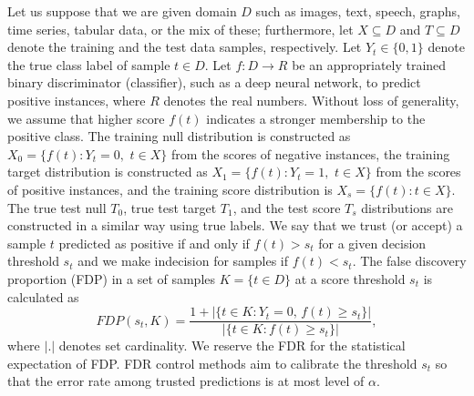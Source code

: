 \documentclass{article}
\begin{document}
Let us suppose that we are given domain $D$ such as images, text, speech, graphs, time series, tabular data, or the mix of these; furthermore, let $X\subseteq D$ and $T\subseteq D$ denote the training and  the test data samples, respectively. Let $Y_t\in\{0,1\}$ denote the true class label of sample $t\in D$. Let $f:D\rightarrow R$ be an appropriately trained binary discriminator (classifier), such as a deep neural network, to predict positive instances, where $R$ denotes the real numbers. Without loss of generality, we assume that higher score $f(t)$ indicates a stronger membership to the positive class. The training null distribution is constructed as $X_0=\{f(t):Y_t = 0,\,\,  t\in X\}$ from the scores of negative instances, the training target distribution is constructed as $X_1=\{f(t): Y_t = 1,\,\,  t\in X\}$ from the scores of positive instances, and the training score distribution is $X_s=\{f(t): t\in X\}$. The true test null $T_0$, true test target $T_1$, and the test score $T_s$ distributions are constructed in a similar way using true labels. We say that we trust (or accept) a  sample $t$ predicted as positive if and only if $f(t)>s_t$ for a given decision threshold  $s_t$ and we make indecision for samples if $f(t) < s_t$. The false discovery proportion (FDP) in a set of samples $K=\{t\in D\}$ at a score threshold $s_t$ is calculated as 
\begin{equation*}
	FDP(s_t,K)=\frac{1+|\{t\in K: Y_t=0,\,f(t)\ge s_t\}|}{|\{t\in K:f(t)\ge s_t\}|},
\end{equation*}
\noindent where $|.|$ denotes set cardinality. We reserve the FDR for the statistical expectation of FDP. FDR control methods aim to calibrate the threshold  $s_t$ so that the error rate among trusted predictions is at most level of $\alpha$. 
\end{document}
